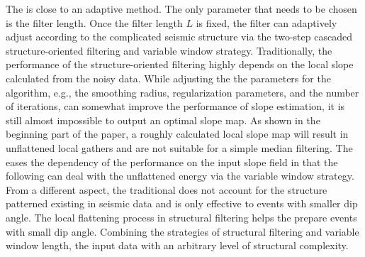 

The  is close to an adaptive method. The only parameter that needs to be chosen is the filter length. Once the filter length $L$ is fixed, the filter can adaptively adjust according to the complicated seismic structure via the two-step cascaded structure-oriented filtering and variable window strategy. Traditionally, the performance of the structure-oriented filtering highly depends on the local slope calculated from the noisy data. While adjusting the the parameters for the  algorithm, e.g., the smoothing radius, regularization parameters, and the number of iterations, can somewhat improve the performance of slope estimation, it is still almost impossible to output an optimal slope map. As shown in the beginning part of the paper, a roughly calculated local slope map will result in unflattened local gathers and are not suitable for a simple median filtering. The  eases the dependency of the performance on the input slope field in that the following  can deal with the unflattened energy via the variable window strategy. From a different aspect, the traditional  does not account for the structure patterned existing in seismic data and is only effective to events with smaller dip angle. The local flattening process in structural filtering helps the  prepare events with small dip angle. Combining the strategies of structural filtering and variable window length, the   input data with an arbitrary level of structural complexity. 


